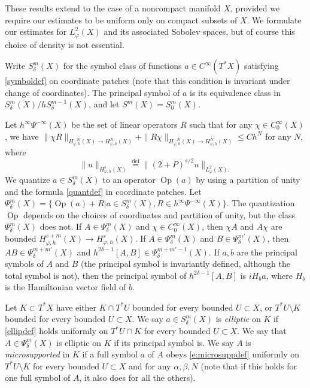 \documentclass[reqno, 12pt]{amsart}
\newcommand \Def {\stackrel{\textrm{def}}=}
\DeclareMathOperator \WF {WF}
\DeclareMathOperator \Op {Op}
\theoremstyle{definition}
\numberwithin{equation}{section}
\numberwithin{prop}{section}
\numberwithin{figure}{section}
\begin{document}
These results extend to the case of a noncompact manifold $X$, provided we require our estimates to be uniform only on compact subsets of $X$. We formulate our estimates for $L^2_\varphi(X)$ and its associated Sobolev spaces, but of course this choice of density is not essential.

Write $S^m_\delta(X)$ for the symbol class of functions  $a \in C^\infty( T^*X)$ satisfying \eqref{symboldef} on coordinate patches (note that this condition is invariant under change of coordinates). The principal symbol of $a$ is its equivalence class in $S_\delta^m(X) / hS_\delta^{m-1}(X)$, and let $S^m(X) = S^m_0(X)$.

Let $h^\infty \Psi^{-\infty}(X)$ be the set of linear operators $R$ such that for any $\chi \in C_0^\infty(X)$, we have  $\|\chi R\|_{H^{-N}_{\varphi,h}(X) \to H^N_{\varphi,h}(X)} + \|R \chi \|_{H^{-N}_{\varphi,h}(X) \to H^N_{\varphi,h}(X)} \le C h^N$ for any $N$,
where  
\begin{equation}\label{e:hphidef}
\|u\|_{H^s_{\varphi,h}(X)} \Def \|(2+P)^{s/2}u\|_{L_\varphi^2(X).}
\end{equation}
We quantize $a \in S_\delta^{m}(X)$ to an operator $\Op(a)$ by using a partition of unity and the formula \eqref{quantdef} in coordinate patches. Let $\Psi_\delta^{m}(X) = \{\Op(a) + R | a \in S_\delta^m(X), R \in h^\infty\Psi^{-\infty}(X)\}$.  The quantization $\Op$ depends on the choices of coordinates and partition of unity, but the class $\Psi_\delta^{m}(X)$ does not. If $A \in \Psi_\delta^{m}(X)$ and $\chi \in C_0^\infty(X)$, then $\chi A$ and $A \chi$ are bounded $H^{s+m}_{\varphi,h}(X) \to H^{s}_{\varphi,h}(X)$.
If $A \in \Psi_\delta^{m}(X)$ and $B \in \Psi_\delta^{m'}(X)$, then $AB \in \Psi_\delta^{m+m'} (X)$ and  $h^{2\delta-1}[A,B] \in \Psi_\delta^{m+m'-1} (X)$. If $a, b$ are  the  principal symbols of $A$ and $B$ (the principal symbol is invariantly defined, although the total symbol is not), then the  principal symbol of $h^{2\delta-1}[A,B]$ is $i H_ba$, where $H_b$ is the Hamiltonian vector field of $b$. 

Let $K \subset T^*X$ have either $K \cap T^*U$ bounded for every bounded $U \subset X$, or $T^*U \setminus K$ bounded for every bounded $U \subset X$. We say $a \in S_\delta^m(X)$ is \emph{elliptic} on $K$ if \eqref{ellipdef} holds
uniformly on $T^*U \cap K$ for every bounded $U \subset X$. We say that $A \in \Psi_\delta^m(X)$ is elliptic on $K$ if its principal symbol is. We say $A$ is \textit{microsupported} in $K$ if a full symbol $a$ of $A$ obeys \eqref{e:microsuppdef}
uniformly on $T^*U \setminus K$ for every bounded $U \subset X$ and for any $\alpha, \beta, N$ (note that if this  holds for one full symbol of $A$, it also does for all the others). %
\end{document}
